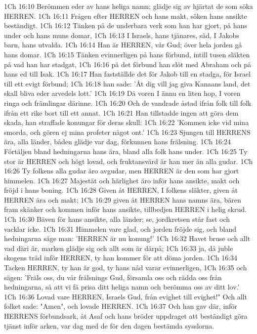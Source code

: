 1Ch 16:10  Berömmen eder av hans heliga namn; glädje sig av hjärtat de som söka HERREN.
1Ch 16:11  Frågen efter HERREN och hans makt, söken hans ansikte beständigt.
1Ch 16:12  Tänken på de underbara verk som han har gjort, på hans under och hans muns domar,
1Ch 16:13  I Israels, hans tjänares, säd, I Jakobs barn, hans utvalda.
1Ch 16:14  Han är HERREN, vår Gud; över hela jorden gå hans domar.
1Ch 16:15  Tänken evinnerligen på hans förbund, intill tusen släkten på vad han har stadgat,
1Ch 16:16  på det förbund han slöt med Abraham och på hans ed till Isak.
1Ch 16:17  Han fastställde det för Jakob till en stadga, för Israel till ett evigt förbund;
1Ch 16:18  han sade: 'Åt dig vill jag giva Kanaans land, det skall bliva eder arvedels lott.'
1Ch 16:19  Då voren I ännu en liten hop, I voren ringa och främlingar därinne.
1Ch 16:20  Och de vandrade åstad ifrån folk till folk ifrån ett rike bort till ett annat.
1Ch 16:21  Han tillstadde ingen att göra dem skada, han straffade konungar för deras skull:
1Ch 16:22  'Kommen icke vid mina smorda, och gören ej mina profeter något ont.'
1Ch 16:23  Sjungen till HERRENS ära, alla länder, båden glädje var dag, förkunnen hans frälsning.
1Ch 16:24  Förtäljen bland hedningarna hans ära, bland alla folk hans under.
1Ch 16:25  Ty stor är HERREN och högt lovad, och fruktansvärd är han mer än alla gudar.
1Ch 16:26  Ty folkens alla gudar äro avgudar, men HERREN är den som har gjort himmelen.
1Ch 16:27  Majestät och härlighet äro inför hans ansikte, makt och fröjd i hans boning.
1Ch 16:28  Given åt HERREN, I folkens släkter, given åt HERREN ära och makt;
1Ch 16:29  given åt HERREN hans namns ära, bären fram skänker och kommen inför hans ansikte, tillbedjen HERREN i helig skrud.
1Ch 16:30  Bäven för hans ansikte, alla länder; se, jordkretsen står fast och vacklar icke.
1Ch 16:31  Himmelen vare glad, och jorden fröjde sig, och bland hedningarna säge man: 'HERREN är nu konung!'
1Ch 16:32  Havet bruse och allt vad däri är, marken glädje sig och allt som är därpå;
1Ch 16:33  ja, då juble skogens träd inför HERREN, ty han kommer för att döma jorden.
1Ch 16:34  Tacken HERREN, ty han är god, ty hans nåd varar evinnerligen,
1Ch 16:35  och sägen: 'Fräls oss, du vår frälsnings Gud, församla oss och rädda oss från hedningarna, så att vi få prisa ditt heliga namn och berömma oss av ditt lov.'
1Ch 16:36  Lovad vare HERREN, Israels Gud, från evighet till evighet!" Och allt folket sade: "Amen", och lovade HERREN.
1Ch 16:37  Och han gav där, inför HERRENS förbundsark, åt Asaf och hans bröder uppdraget att beständigt göra tjänst inför arken, var dag med de för den dagen bestämda sysslorna.
